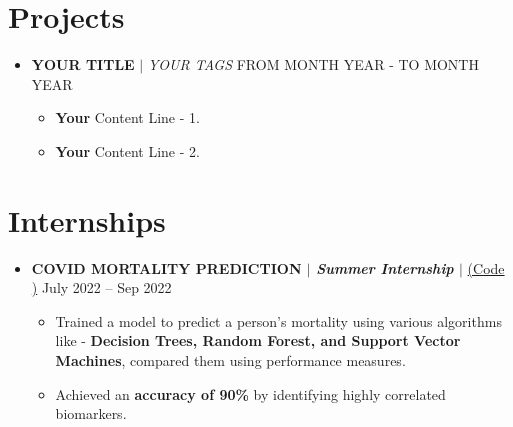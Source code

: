 \documentclass[letterpaper,5pt]{article}
\begin{document}
    
    \section{Projects}
    
        \begin{itemize}[leftmargin=0.15in,label={}]
          \item{
            \textbf{YOUR TITLE} $|$ \emph{YOUR TAGS}
          }
          \hfill FROM MONTH YEAR - TO MONTH YEAR
          \begin{itemize}
            \item[\textbullet{}]\textbf{Your} Content Line - 1.
            \item[\textbullet{}]\textbf{Your} Content Line - 2.
          \end{itemize}
          \end{itemize}

        


    
      
        \section{Internships}
        \begin{itemize}
        
            \item[]
            \textbf{COVID MORTALITY PREDICTION $|$ \emph{Summer Internship} $|$} 
            \href{https://github.com/GSK-10/Covid_Mortality_Prediction}{({Code} \faExternalLink*)} \hfill July 2022 -- Sep 2022
            \begin{itemize}
                \item[\textbullet] Trained a model to predict a person's mortality using various algorithms like - \textbf{Decision Trees, Random Forest, and Support Vector Machines}, compared them using performance measures.
                \item[\textbullet] Achieved an \textbf{accuracy of 90\%} by identifying highly correlated biomarkers.
            \end{itemize}
      \end{itemize}
      
    
\end{document}
